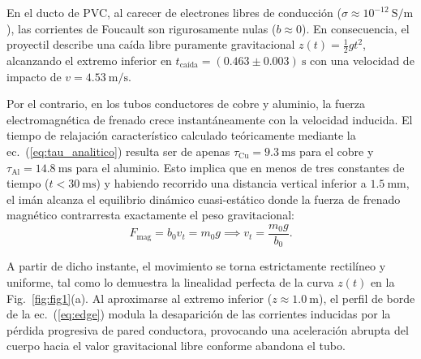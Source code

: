 \documentclass[aps,prb,reprint,twocolumn,superscriptaddress,amsmath,amssymb,floatfix]{revtex4-2}
\begin{document}
En el ducto de PVC, al carecer de electrones libres de conducción ($\sigma \approx 10^{-12}\ \mathrm{S/m}$), las corrientes de Foucault son rigurosamente nulas ($b \approx 0$). En consecuencia, el proyectil describe una caída libre puramente gravitacional $z(t) = \frac{1}{2}gt^2$, alcanzando el extremo inferior en $t_{\mathrm{caída}} = (0.463 \pm 0.003)\ \mathrm{s}$ con una velocidad de impacto de $v = 4.53\ \mathrm{m/s}$.

Por el contrario, en los tubos conductores de cobre y aluminio, la fuerza electromagnética de frenado crece instantáneamente con la velocidad inducida. El tiempo de relajación característico calculado teóricamente mediante la ec.~(\ref{eq:tau_analitico}) resulta ser de apenas $\tau_{\mathrm{Cu}} = 9.3\ \mathrm{ms}$ para el cobre y $\tau_{\mathrm{Al}} = 14.8\ \mathrm{ms}$ para el aluminio. Esto implica que en menos de tres constantes de tiempo ($t < 30\ \mathrm{ms}$) y habiendo recorrido una distancia vertical inferior a $1.5\ \mathrm{mm}$, el imán alcanza el equilibrio dinámico cuasi-estático donde la fuerza de frenado magnético contrarresta exactamente el peso gravitacional:
\begin{equation}
F_{\mathrm{mag}} = b_0 v_t = m_0 g \implies v_t = \frac{m_0 g}{b_0}.
\label{eq:equilibrio}
\end{equation}

A partir de dicho instante, el movimiento se torna estrictamente rectilíneo y uniforme, tal como lo demuestra la linealidad perfecta de la curva $z(t)$ en la Fig.~\ref{fig:fig1}(a). Al aproximarse al extremo inferior ($z \approx 1.0\ \mathrm{m}$), el perfil de borde de la ec.~(\ref{eq:edge}) modula la desaparición de las corrientes inducidas por la pérdida progresiva de pared conductora, provocando una aceleración abrupta del cuerpo hacia el valor gravitacional libre conforme abandona el tubo.
\end{document}
